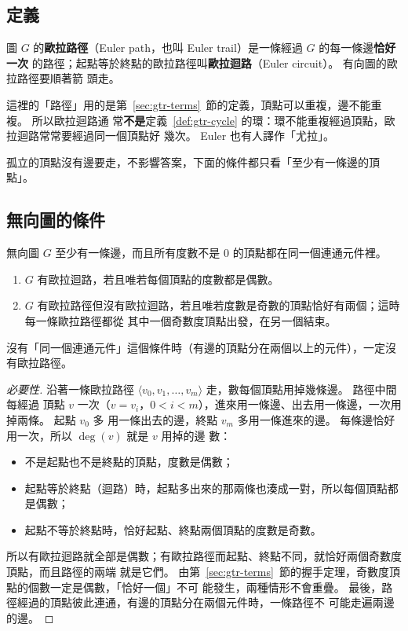 \subsection{定義}

\begin{definition}
\label{def:gtr-euler}
圖 $G$ 的\textbf{歐拉路徑}（Euler path，也叫 Euler trail）是一條經過 $G$ 的每一條邊\textbf{恰好一次}
的路徑；起點等於終點的歐拉路徑叫\textbf{歐拉迴路}（Euler circuit）。 有向圖的歐拉路徑要順著箭
頭走。
\end{definition}

這裡的「路徑」用的是第~\ref{sec:gtr-terms}~節的定義，頂點可以重複，邊不能重複。 所以歐拉迴路通
常\textbf{不是}定義~\ref{def:gtr-cycle} 的環：環不能重複經過頂點，歐拉迴路常常要經過同一個頂點好
幾次。 Euler 也有人譯作「尤拉」。

孤立的頂點沒有邊要走，不影響答案，下面的條件都只看「至少有一條邊的頂點」。

\subsection{無向圖的條件}

\begin{theorem}
\label{thm:gtr-euler}
無向圖 $G$ 至少有一條邊，而且所有度數不是 $0$ 的頂點都在同一個連通元件裡。
\begin{enumerate}
\item $G$ 有歐拉迴路，若且唯若每個頂點的度數都是偶數。
\item $G$ 有歐拉路徑但沒有歐拉迴路，若且唯若度數是奇數的頂點恰好有兩個；這時每一條歐拉路徑都從
其中一個奇數度頂點出發，在另一個結束。
\end{enumerate}
沒有「同一個連通元件」這個條件時（有邊的頂點分在兩個以上的元件），一定沒有歐拉路徑。
\end{theorem}

\begin{proof}[必要性]
沿著一條歐拉路徑 $\langle v_0, v_1, \ldots, v_m \rangle$ 走，數每個頂點用掉幾條邊。 路徑中間每經過
頂點 $v$ 一次（$v = v_i$，$0 < i < m$），進來用一條邊、出去用一條邊，一次用掉兩條。 起點 $v_0$ 多
用一條出去的邊，終點 $v_m$ 多用一條進來的邊。 每條邊恰好用一次，所以 $\deg(v)$ 就是 $v$ 用掉的邊
數：
\begin{itemize}
\item 不是起點也不是終點的頂點，度數是偶數；
\item 起點等於終點（迴路）時，起點多出來的那兩條也湊成一對，所以每個頂點都是偶數；
\item 起點不等於終點時，恰好起點、終點兩個頂點的度數是奇數。
\end{itemize}
所以有歐拉迴路就全部是偶數；有歐拉路徑而起點、終點不同，就恰好兩個奇數度頂點，而且路徑的兩端
就是它們。 由第~\ref{sec:gtr-terms}~節的握手定理，奇數度頂點的個數一定是偶數，「恰好一個」不可
能發生，兩種情形不會重疊。 最後，路徑經過的頂點彼此連通，有邊的頂點分在兩個元件時，一條路徑不
可能走遍兩邊的邊。
\end{proof}

